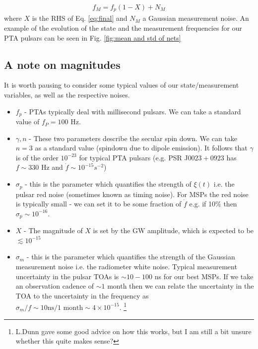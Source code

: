 \documentclass{tufte-handout} %
\begin{document}
\begin{eqnarray}
	f_M = f_p(1 - X) + N_M
\end{eqnarray}
where $X$ is the RHS of Eq. \ref{eq:final} and $N_M$ a Gaussian measurement noise. An example of the evolution of the state and the measurement frequencies for our PTA pulsars can be seen in Fig. \ref{fig:mean and std of nets}







\subsection{A note on magnitudes}

It is worth pausing to consider some typical values of our state/measurement variables, as well as the respective noises. 


\begin{itemize}
	\item $f_p$ - PTAs typically deal with millisecond pulsars. We can take a standard value of $f_P = 100$ Hz.
	\item $\gamma, n$ - These two parameters describe the secular spin down. We can take $n=3$ as a standard value (spindown due to dipole emission). It follows that $\gamma$ is of the order $10^{-23}$ for typical PTA pulsars (e.g. PSR J$0023+0923$ has $f\sim 330$ Hz and $\dot{f} \sim 10^{-15} s^{-2}$)
	\item $\sigma_p$ - this is the parameter which quantifies the strength of  $\xi(t)$ i.e. the pulsar red noise (sometimes known as timing noise). For MSPs the red noise is typically small - we can set it to be some fraction of $\dot{f}$ e.g. if 10$\%$ then $\sigma_p \sim 10^{-16}$.
	\item $X$ - The magnitude of $X$ is set by the GW amplitude, which is expected to be $\lesssim 10^{-15}$ 
	\item $\sigma_m$ - this is the parameter which quantifies the strength of the Gaussian measurement noise i.e. the radiometer white noise. Typical measurement uncertainty in the pulsar TOAs is $\sim 10 - 100$ ns for our best MSPs. If we take an observation cadence of $\sim 1$ month then we can relate the uncertainty in the TOA to the uncertainty in the frequency as $\sigma_m / f \sim 10 \text{ns} / 1 \text{ month}  \sim 4 \times 10^{-15}$. \footnote{L.Dunn gave some good advice on how this works, but I am still a bit unsure whether this quite makes sense?}
\end{itemize}
\end{document}
